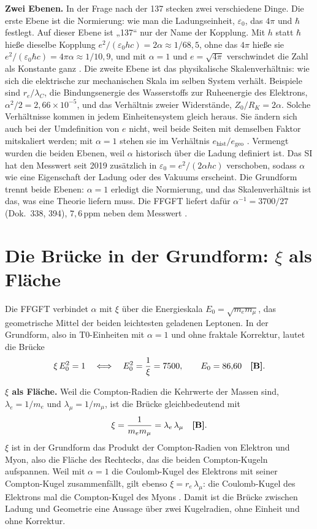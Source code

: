 \textbf{Zwei Ebenen.} In der Frage nach der 137 stecken zwei verschiedene Dinge. Die erste Ebene
ist die Normierung: wie man die Ladungseinheit, $\varepsilon_0$, das $4\pi$ und $\hbar$ festlegt.
Auf dieser Ebene ist „137“ nur der Name der Kopplung. Mit $h$ statt $\hbar$ hieße dieselbe
Kopplung $e^2/(\varepsilon_0hc)=2\alpha\approx1/68{,}5$, ohne das $4\pi$ hieße sie
$e^2/(\varepsilon_0\hbar c)=4\pi\alpha\approx1/10{,}9$, und mit $\alpha=1$ und $e=\sqrt{4\pi}$
verschwindet die Zahl als Konstante ganz \QM. Die zweite Ebene ist das physikalische
Skalenverhältnis: wie sich die elektrische zur mechanischen Skala im selben System verhält. Beispiele
sind $r_e/\lambda_C$, die Bindungsenergie des Wasserstoffs zur Ruheenergie des Elektrons,
$\alpha^2/2=2{,}66\times10^{-5}$, und das Verhältnis zweier Widerstände, $Z_0/R_K=2\alpha$. Solche
Verhältnisse kommen in jedem Einheitensystem gleich heraus. Sie ändern sich auch bei der
Umdefinition von $e$ nicht, weil beide Seiten mit demselben Faktor mitskaliert werden; mit
$\alpha=1$ stehen sie im Verhältnis $e_{\text{hist}}/e_{\text{geo}}$ \BM. Vermengt wurden die
beiden Ebenen, weil $\alpha$ historisch über die Ladung definiert ist. Das SI hat den Messwert seit
2019 zusätzlich in $\varepsilon_0=e^2/(2\alpha hc)$ verschoben, sodass $\alpha$ wie eine
Eigenschaft der Ladung oder des Vakuums erscheint. Die Grundform trennt beide Ebenen: $\alpha=1$
erledigt die Normierung, und das Skalenverhältnis ist das, was eine Theorie liefern muss. Die
FFGFT liefert dafür $\alpha^{-1}=3700/27$ (Dok.~338, 394), $7{,}6$\,ppm neben dem Messwert \KM.

\section{Die Brücke in der Grundform: \texorpdfstring{$\xi$}{xi} als Fläche}

Die FFGFT verbindet $\alpha$ mit $\xi$ über die Energieskala $E_0=\sqrt{m_em_\mu}$, das
geometrische Mittel der beiden leichtesten geladenen Leptonen. In der Grundform, also in
T0-Einheiten mit $\alpha=1$ und ohne fraktale Korrektur, lautet die Brücke
\begin{equation}
  \xi\,E_0^2=1\quad\Longleftrightarrow\quad E_0^2=\frac1\xi=7500,\qquad E_0=86{,}60
  \quad\textbf{[B]} .
\end{equation}

\textbf{$\xi$ als Fläche.} Weil die Compton-Radien die Kehrwerte der Massen sind,
$\lambda_e=1/m_e$ und $\lambda_\mu=1/m_\mu$, ist die Brücke gleichbedeutend mit
\begin{equation}
  \xi=\frac{1}{m_em_\mu}=\lambda_e\,\lambda_\mu\quad\textbf{[B]} .
\end{equation}
$\xi$ ist in der Grundform das Produkt der Compton-Radien von Elektron und Myon, also die Fläche
des Rechtecks, das die beiden Compton-Kugeln aufspannen. Weil mit $\alpha=1$ die Coulomb-Kugel
des Elektrons mit seiner Compton-Kugel zusammenfällt, gilt ebenso $\xi=r_e\,\lambda_\mu$: die
Coulomb-Kugel des Elektrons mal die Compton-Kugel des Myons \BM. Damit ist die Brücke zwischen
Ladung und Geometrie eine Aussage über zwei Kugelradien, ohne Einheit und ohne Korrektur.

